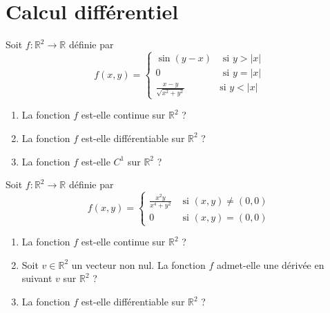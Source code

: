 \documentclass[a4paper]{tp_um}
\begin{document}
\begin{enumerate}
{        \begin{center}
        \end{center}
    }
\end{enumerate}

\section{Calcul différentiel}

\exo{} Soit $f : \mathbb R^2 \to \mathbb R$ définie par
$$
f(x,y)=\begin{cases}
\sin(y-x) & \text{ si }  y>|x|  \\
0 & \text{ si }  y=|x| \\  
\frac{x-y}{\sqrt{x^2 + y^2}} & \text{si }  y<|x| 
\end{cases}
$$
\begin{enumerate}
\item La fonction $f$ est-elle continue sur $\mathbb R^2$ ?
\item La fonction $f$ est-elle différentiable sur $\mathbb R^2$ ?
\item La fonction $f$ est-elle $C^1$ sur $\mathbb R^2$ ?
\end{enumerate}


\exo{} Soit $f : \mathbb R^2 \to \mathbb R$ définie par
$$
f(x,y)=\begin{cases}
\frac{x^2y}{x^4+y^2} & \text{ si } (x,y) \neq (0,0)  \\
0 & \text{ si } (x,y)=(0,0) 
\end{cases}
$$
\begin{enumerate}
\item La fonction $f$ est-elle continue sur $\mathbb R^2$ ?
\item Soit $v \in \mathbb R^2$ un vecteur non nul. La fonction $f$ admet-elle une dérivée en suivant $v$ sur $\mathbb R^2$ ?
\item La fonction $f$ est-elle différentiable sur $\mathbb R^2$ ?
\end{enumerate}
\end{document}
